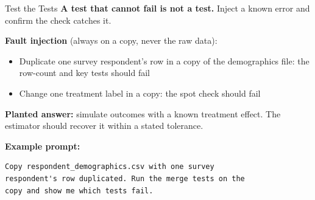 \documentclass[aspectratio=169, 11pt]{beamer}
\begin{document}
\begin{frame}[fragile]{Test the Tests}
  \textbf{A test that cannot fail is not a test.} Inject a known error and confirm the check catches it.

  \vspace{0.5em}
  \textbf{Fault injection} (always on a copy, never the raw data):
  \begin{itemize}
    \item Duplicate one survey respondent's row in a copy of the demographics file: the row-count and key tests should fail
    \item Change one treatment label in a copy: the spot check should fail
  \end{itemize}

  \vspace{0.3em}
  \textbf{Planted answer:} simulate outcomes with a known treatment effect. The estimator should recover it within a stated tolerance.

  \vspace{0.5em}
  \textbf{Example prompt:}
  \begin{lstlisting}[basicstyle=\ttfamily\footnotesize]
Copy respondent_demographics.csv with one survey
respondent's row duplicated. Run the merge tests on the
copy and show me which tests fail.
  \end{lstlisting}
\end{frame}
\end{document}

